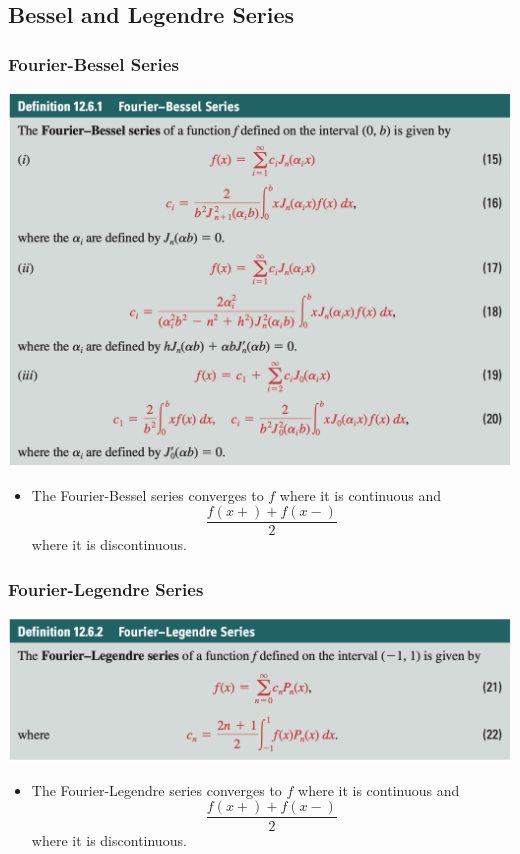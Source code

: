 \documentclass{article}
\begin{document}
\subsection{Bessel and Legendre Series}

\subsubsection{Fourier-Bessel Series}

\includegraphics[scale=0.47]{fourier-bessel-series}

\begin{itemize}
  \item The Fourier-Bessel series converges to $f$ where it is continuous and \[\frac{f(x+) + f(x-)}{2}\] where it is discontinuous.
\end{itemize}

\subsubsection{Fourier-Legendre Series}

\includegraphics[scale=0.47]{fourier-legendre-series}

\begin{itemize}
  \item The Fourier-Legendre series converges to $f$ where it is continuous and \[\frac{f(x+) + f(x-)}{2}\] where it is discontinuous.
\end{itemize}
\end{document}
